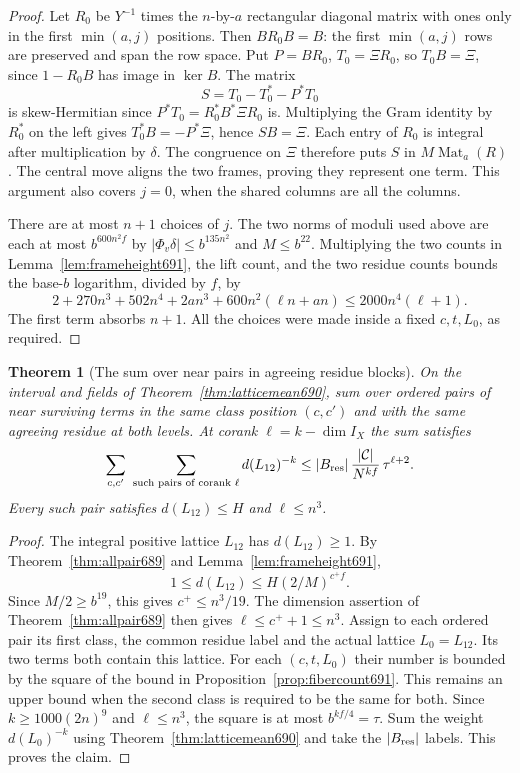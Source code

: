 \documentclass[a4paper,11pt]{article}
\newtheorem{theorem}[proposition]{Theorem}
\theoremstyle{definition}
\theoremstyle{remark}
\numberwithin{equation}{section}
\begin{document}
\begin{proof}
Let \(R_0\) be \(Y^{-1}\) times the \(n\)-by-\(a\) rectangular
diagonal matrix with ones only in the first \(\min(a,j)\)
positions. Then \(BR_0B=B\): the first \(\min(a,j)\)
rows are preserved and span the row space. Put \(P=BR_0\),
\(T_0=\Xi R_0\), so \(T_0B=\Xi\), since
\(1-R_0B\) has image in \(\ker B\). The matrix
\[
                        S=T_0-T_0^*-P^*T_0
\]
is skew-Hermitian since \(P^*T_0=R_0^*B^*\Xi R_0\) is.
Multiplying the Gram identity by \(R_0^*\) on the left
gives \(T_0^*B=-P^*\Xi\), hence \(SB=\Xi\).
Each entry of \(R_0\) is integral after multiplication by
\(\delta\). The congruence on \(\Xi\) therefore puts \(S\)
in \(M\operatorname{Mat}_a(R)\). The central move aligns
the two frames, proving they represent one term. This
argument also covers \(j=0\), when the shared columns are
all the columns.

There are at most \(n+1\) choices of \(j\). The two norms of
moduli used above are each at most \(b^{600n^2 f}\) by
\(|\Phi_v\delta|\le b^{135n^2}\) and \(M\le b^{22}\).
Multiplying the two counts in Lemma~\ref{lem:frameheight691},
the lift count, and the two residue counts bounds the base-\(b\)
logarithm, divided by \(f\), by
\[
    2+270n^3+502n^4+2an^3+600 n^2(\ell n+an)
                                  \le 2000n^4(\ell+1).
\]
The first term absorbs \(n+1\). All the choices were made
inside a fixed \(c,t,L_0\), as required.
\end{proof}

\begin{theorem}[The sum over near pairs in agreeing residue blocks]
\leavevmode\label{thm:paircount691}
On the interval and fields of Theorem~\ref{thm:latticemean690},
sum over ordered pairs of near surviving terms in the same
class position \((c,c')\) and with the same agreeing residue
at both levels. At corank \(\ell=k-\dim I_X\) the sum satisfies
\[
       \sum_{c,c'}\ \sum_{\text{such pairs of corank }\ell}
                    d(L_{12})^{-k}
       \le |B_{\rm res}|\,\frac{|\mathcal C|}{N^{kf}}\,
                                                   \tau^{\ell+2}.
\]
Every such pair satisfies \(d(L_{12})\le H\) and \(\ell\le n^3\).
\end{theorem}
\begin{proof}
The integral positive lattice \(L_{12}\) has \(d(L_{12})\ge1\).
By Theorem~\ref{thm:allpair689} and
Lemma~\ref{lem:frameheight691},
\[
         1\le d(L_{12})\le H(2/M)^{c^+ f}.
\]
Since \(M/2\ge b^{19}\), this gives \(c^+\le n^3/19\).
The dimension assertion of Theorem~\ref{thm:allpair689}
then gives \(\ell\le c^++1\le n^3\).
Assign to each ordered pair its first class, the common
residue label and the actual lattice \(L_0=L_{12}\).
Its two terms both contain this lattice. For each
\((c,t,L_0)\) their number is bounded by the square of the
bound in Proposition~\ref{prop:fibercount691}. This remains
an upper bound when the second class is required to be the
same for both. Since \(k\ge1000(2n)^9\) and \(\ell\le n^3\),
the square is at most \(b^{kf/4}=\tau\). Sum the weight
\(d(L_0)^{-k}\) using Theorem~\ref{thm:latticemean690}
and take the \(|B_{\rm res}|\) labels. This proves the claim.
\end{proof}
\end{document}

